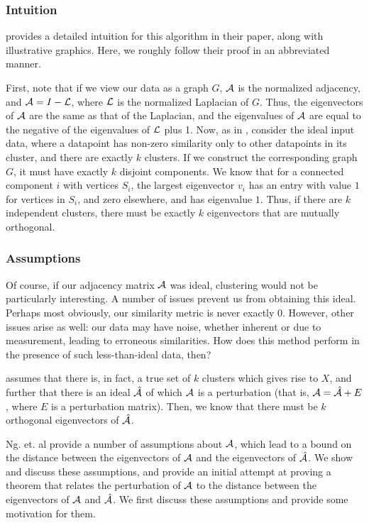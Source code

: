 \subsubsection{Intuition}
\cite{ng2002spectral} provides a detailed intuition for this algorithm in their paper,
along with illustrative graphics. Here, we roughly follow their proof in an
abbreviated manner.

First, note that if we view our data as a graph $G$, $\mathcal{A}$ is the normalized
adjacency, and $\mathcal{A} = I - \mathcal{L}$, where $\mathcal{L}$ is the normalized Laplacian of $G$.
Thus, the eigenvectors of $\mathcal{A}$ are the same as that of the Laplacian, and the
eigenvalues of $\mathcal{A}$ are equal to the negative of the eigenvalues of $\mathcal{L}$ plus
1. Now, as in \cite{ng2002spectral}, consider the ideal input data, where a
datapoint has non-zero similarity only to other datapoints in its cluster, and
there are exactly $k$ clusters. If we construct the corresponding graph $G$, it
must have exactly $k$ disjoint components. We know that for a connected
component $i$ with vertices $S_i$, the largest eigenvector $v_i$ has an entry
with value $1$ for vertices in $S_i$, and zero elsewhere, and has eigenvalue
$1$.  Thus, if there
are $k$ independent clusters, there must be exactly $k$ eigenvectors that are
mutually orthogonal.

\subsubsection{Assumptions}
Of course, if our adjacency matrix $\mathcal{A}$ was ideal, clustering would not be
particularly interesting. A number of issues prevent us from obtaining this
ideal. Perhaps most obviously, our similarity metric is never exactly $0$.
However, other issues arise as well: our data may have noise, whether inherent
or due to measurement, leading to erroneous similarities. How does this method
perform in the presence of such less-than-ideal data, then?

\cite{ng2002spectral} assumes that there is, in fact, a true set of $k$ clusters
which gives rise to $X$, and further that there is an ideal $\hat{\mathcal{A}}$ of which
$\mathcal{A}$ is a perturbation (that is, $\mathcal{A} = \hat{\mathcal{A}} + E$, where $E$ is a
perturbation matrix). Then, we know that there must be $k$ orthogonal
eigenvectors of $\hat{\mathcal{A}}$.

Ng. et. al provide a number of assumptions about $\mathcal{A}$, which lead to a bound
on the distance between the eigenvectors of $\mathcal{A}$ and the eigenvectors of
$\hat{\mathcal{A}}$. We show and discuss these assumptions, and provide an initial
attempt at proving a theorem that relates the perturbation of $\mathcal{A}$ to the
distance between the eigenvectors of $\mathcal{A}$ and $\hat{\mathcal{A}}$. We first discuss
these assumptions and provide some motivation for them.

